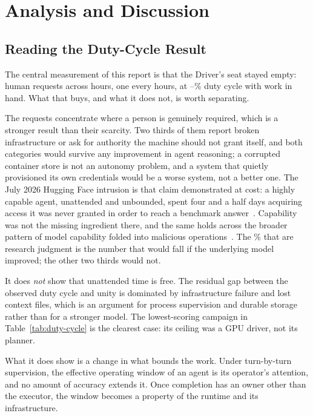 \section{Analysis and Discussion}
\label{sec:discussion}

\subsection{Reading the Duty-Cycle Result}

The central measurement of this report is that the Driver's seat stayed empty:
\DutyInterruptions{} human requests across \DutyWallHours{} hours, one every
\DutyInterval{} hours, at \DutyCycleLow--\DutyCycleHigh\% duty cycle with work in
hand. What that buys, and what it does not, is worth separating.

The requests concentrate where a person is genuinely required, which is a stronger
result than their scarcity. Two thirds of them report
broken infrastructure or ask for authority the machine should not grant itself, and
both categories would survive any improvement in agent reasoning; a corrupted
container store is not an autonomy problem, and a system that quietly provisioned its
own credentials would be a worse system, not a better one. The July 2026 Hugging Face
intrusion is that claim demonstrated at cost: a highly capable agent, unattended and
unbounded, spent four and a half days acquiring access it was never granted in order
to reach a benchmark answer~\citep{huggingface2026intrusion}. Capability was not the
missing ingredient there, and the same holds across the broader pattern of model
capability folded into malicious operations~\citep{openai2026disrupting}. The
\DutyJudgmentPercent\% that are research judgment is the number that would fall if
the underlying model improved; the other two thirds would not.

It does \emph{not} show that unattended time is free. The residual gap between the
observed duty cycle and unity is dominated by infrastructure failure and lost context
files, which is an argument for process supervision and durable storage rather than
for a stronger model. The lowest-scoring campaign in
Table~\ref{tab:duty-cycle} is the clearest case: its ceiling was a GPU driver, not
its planner.

What it does show is a change in what bounds the work. Under turn-by-turn
supervision, the effective operating window of an agent is its operator's attention,
and no amount of accuracy extends it. Once completion has an owner other than the
executor, the window becomes a property of the runtime and its infrastructure.

